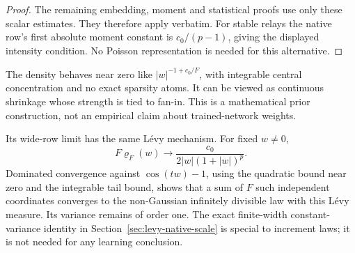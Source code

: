 \begin{proof}
The remaining embedding, moment and statistical proofs use only these scalar estimates. They therefore apply verbatim. For stable relays the native row's first absolute moment constant is $c_0/(p-1)$, giving the displayed intensity condition. No Poisson representation is needed for this alternative.
\end{proof}

The density behaves near zero like $|w|^{-1+c_0/F}$, with integrable central concentration and no exact sparsity atoms. It can be viewed as continuous shrinkage whose strength is tied to fan-in. This is a mathematical prior construction, not an empirical claim about trained-network weights.

Its wide-row limit has the same L\'evy mechanism. For fixed $w\ne0$,
\[
 F\varrho_F(w)\longrightarrow
 \frac{c_0}{2|w|(1+|w|)^p}.
\]
Dominated convergence against $\cos(tw)-1$, using the quadratic bound near zero and the integrable tail bound, shows that a sum of $F$ such independent coordinates converges to the non-Gaussian infinitely divisible law with this L\'evy measure. Its variance remains of order one. The exact finite-width constant-variance identity in Section~\ref{sec:levy-native-scale} is special to increment laws; it is not needed for any learning conclusion.
